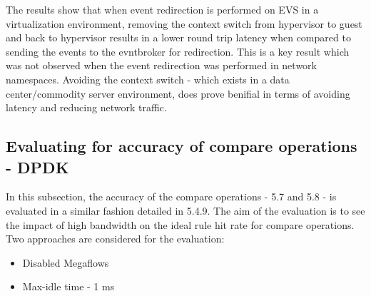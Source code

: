 The results show that when event redirection is performed on EVS in a virtualization environment, removing the context switch from hypervisor to guest and back to hypervisor results in a lower round trip latency when compared to sending the events to the evntbroker for redirection. This is a key result which was not observed when the event redirection was performed in network namespaces. Avoiding the context switch - which exists in a data center/commodity server environment, does prove benifial in terms of avoiding latency and reducing network traffic. 



\subsection{Evaluating for accuracy of compare operations - DPDK}
In this subsection, the accuracy of the compare operations - 5.7 and 5.8 - is evaluated in a similar fashion detailed in 5.4.9. The aim of the evaluation is to see the impact of high bandwidth on the ideal rule hit rate for compare operations. Two approaches are considered for the evaluation: 
\begin{itemize}
 \item Disabled Megaflows
 \item Max-idle time - 1 ms
\end{itemize} 


\delaydata



